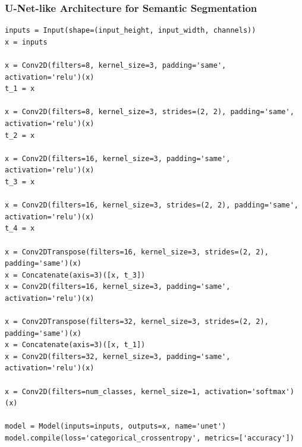 \subsubsection{U-Net-like Architecture for Semantic Segmentation}

\begin{verbatim}
inputs = Input(shape=(input_height, input_width, channels))
x = inputs

x = Conv2D(filters=8, kernel_size=3, padding='same', activation='relu')(x)
t_1 = x

x = Conv2D(filters=8, kernel_size=3, strides=(2, 2), padding='same', activation='relu')(x)
t_2 = x

x = Conv2D(filters=16, kernel_size=3, padding='same', activation='relu')(x)
t_3 = x

x = Conv2D(filters=16, kernel_size=3, strides=(2, 2), padding='same', activation='relu')(x)
t_4 = x

x = Conv2DTranspose(filters=16, kernel_size=3, strides=(2, 2), padding='same')(x)
x = Concatenate(axis=3)([x, t_3])
x = Conv2D(filters=16, kernel_size=3, padding='same', activation='relu')(x)

x = Conv2DTranspose(filters=32, kernel_size=3, strides=(2, 2), padding='same')(x)
x = Concatenate(axis=3)([x, t_1])
x = Conv2D(filters=32, kernel_size=3, padding='same', activation='relu')(x)

x = Conv2D(filters=num_classes, kernel_size=1, activation='softmax')(x)

model = Model(inputs=inputs, outputs=x, name='unet')
model.compile(loss='categorical_crossentropy', metrics=['accuracy'])
\end{verbatim}
